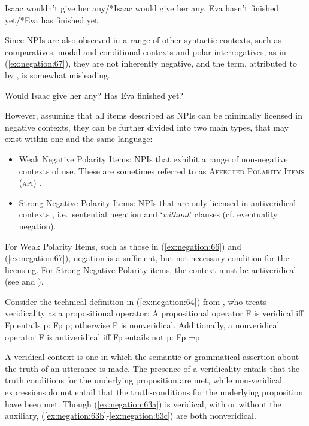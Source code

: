 \documentclass[output=paper,hidelinks]{langscibook}
\begin{document}
\ea\label{ex:negation:66} 
\ea Isaac wouldn't give her any/*Isaac would give her any.
\ex Eva hasn't finished yet/*Eva has finished yet.
\z\z

Since NPIs are also observed in a range of other syntactic contexts, such as comparatives, modal and conditional contexts and polar interrogatives, as in (\ref{ex:negation:67}), they are not inherently negative, and the term, attributed to \citet {Baker:70}  by \citet{Haspelmath:97}, is somewhat misleading.

\ea\label{ex:negation:67} 
\ea Would Isaac give her any?
\ex Has Eva finished yet?
\z\z

However, assuming that all items described as NPIs can be minimally licensed in negative contexts, they can be further divided into two main types, that may exist within one and the same language:

\begin{itemize}
\item Weak Negative Polarity Items: NPIs that exhibit a range of non-negative contexts of use. These are sometimes referred to as \textsc{Affected Polarity Items} (\textsc{api}) \citep {Giannakidou:98}.
\item Strong Negative Polarity Items: NPIs that are only licensed in antiveridical contexts \citep{Giannakidou:98}, i.e.\ sentential negation and `\emph{without}' clauses (cf. eventuality negation).
\end{itemize}
For Weak Polarity Items, such as those in (\ref{ex:negation:66}) and (\ref{ex:negation:67}), negation is a sufficient, but not necessary condition for the licensing. For Strong Negative Polarity items, the context must be antiveridical (see \citealt{Zwarts:95} and \citealt{Giannakidou:98}).

Consider the technical definition in (\ref{ex:negation:64}) from \citet{Giannakidou:02}, who treats veridicality as a propositional operator:
\ea\label{ex:negation:64} 
A propositional operator F is veridical iff Fp entails p: Fp \RIGHT p; otherwise F is nonveridical.
Additionally, a nonveridical operator F is antiveridical iff Fp entails not p: Fp \RIGHT ¬p.
\z

A veridical context is one in which the semantic or grammatical assertion about the truth of an utterance is made. The presence of a veridicality entails that the truth conditions for the underlying proposition are met, while non-veridical expressions do not entail that the truth-conditions for the underlying proposition have been met. Though (\ref{ex:negation:63a}) is veridical, with or without the auxiliary, (\ref{ex:negation:63b}-\ref{ex:negation:63c}) are both nonveridical. 
\end{document}

